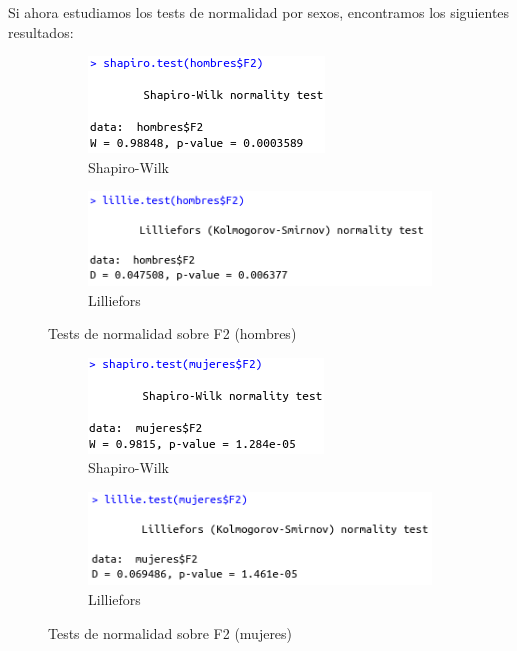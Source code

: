 Si ahora estudiamos los tests de normalidad por sexos, encontramos los siguientes resultados:
\begin{figure}[H]
	\centering
	\begin{subfigure}{.5\textwidth}
		\centering
		\includegraphics[width=.6\linewidth]{swh-F2.png}
		\caption{Shapiro-Wilk}
		\label{fig:swh-F2}
	\end{subfigure}%
	\begin{subfigure}{.5\textwidth}
		\centering
		\includegraphics[width=.6\linewidth]{lh-F2.png}
		\caption{Lilliefors}
		\label{fig:lh-F2}
	\end{subfigure}
	\caption{Tests de normalidad sobre F2 (hombres)}
	\label{fig:normhF2}
\end{figure}






\begin{figure}[H]
	\centering
	\begin{subfigure}{.5\textwidth}
		\centering
		\includegraphics[width=.6\linewidth]{swm-F2.png}
		\caption{Shapiro-Wilk}
		\label{fig:swm-F2}
	\end{subfigure}%
	\begin{subfigure}{.5\textwidth}
		\centering
		\includegraphics[width=.6\linewidth]{lm-F2.png}
		\caption{Lilliefors}
		\label{fig:lm-F2}
	\end{subfigure}
	\caption{Tests de normalidad sobre F2 (mujeres)}
	\label{fig:normmF2}
\end{figure}


